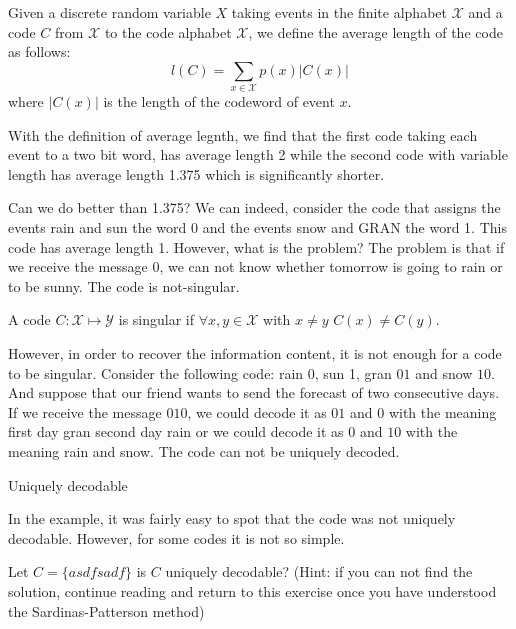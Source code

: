 \begin{definition}
Given a discrete random variable $X$ taking events in the finite alphabet $\mathcal X$ and a code $C$ from $\mathcal X$ to the code alphabet $\mathcal X$, we define the average length of the code as follows:
\begin{equation}
l(C)=\sum_{x\in\mathcal X}p(x)|C(x)|
\end{equation}
where $|C(x)|$ is the length of the codeword of event $x$.
\end{definition}
\begin{exercise}
With the definition of average legnth, we find that the first code taking each event to a two bit word, has average length 2 while the second code with variable length has average length 1.375 which is significantly shorter. 
\end{exercise}

Can we do better than 1.375? We can indeed, consider the code that assigns the events rain and sun the word 0 and the events snow and GRAN the word 1. 
This code has average length 1. 
However, what is the problem? 
The problem is that if we receive the message 0, we can not know whether tomorrow is going to rain or to be sunny. 
The code is not-singular.

\begin{definition}
A code $C:\mathcal X\mapsto\mathcal Y$ is singular if $\forall x,y\in\mathcal X$ with $x\neq y$ $C(x)\neq C(y)$.
\end{definition}

However, in order to recover the information content, it is not enough for a code to be singular. Consider the following code: rain 0, sun 1, gran $01$ and snow $10$. 
And suppose that our friend wants to send the forecast of two consecutive days. 
If we receive the message $010$, we could decode it as $01$ and $0$ with the meaning first day gran second day rain or we could decode it as $0$ and $10$ with the meaning rain and snow.
The code can not be uniquely decoded.

\begin{definition}
Uniquely decodable
\end{definition}

In the example, it was fairly easy to spot that the code was not uniquely decodable. However, for some codes it is not so simple.
\begin{exercise}
Let $C=\{asdfsadf\}$ is $C$ uniquely decodable? (Hint: if you can not find the solution, continue reading and return to this exercise once you have understood the Sardinas-Patterson method)
\end{exercise}

